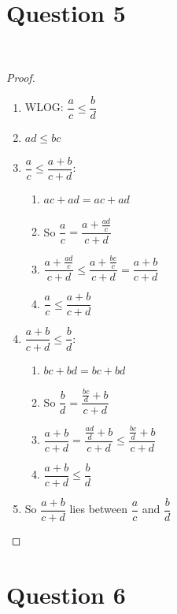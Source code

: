 \documentclass{article}
\begin{document}
\newpage

\section*{Question 5}

~

\begin{proof}
    ~
    \begin{enumerate}
        \item WLOG: $\dfrac{a}{c}\leq\dfrac{b}{d}$
        \item $ad\leq bc$
        \item $\dfrac{a}{c}\leq \dfrac{a+b}{c+d}:$
        \begin{enumerate}
            \item $ac+ad=ac+ad$
            \item So $\dfrac{a}{c}=\dfrac{a+\frac{ad}{c}}{c+d}$
            \item $\dfrac{a+\frac{ad}{c}}{c+d}\leq \dfrac{a+\frac{bc}{c}}{c+d}=\dfrac{a+b}{c+d}$
            \item $\dfrac{a}{c}\leq \dfrac{a+b}{c+d}$
        \end{enumerate}
        \item $\dfrac{a+b}{c+d}\leq \dfrac{b}{d}:$
        \begin{enumerate}
            \item $bc+bd=bc+bd$
            \item So $\dfrac{b}{d}=\dfrac{\frac{bc}{d}+b}{c+d}$
            \item $\dfrac{a+b}{c+d}=\dfrac{\frac{ad}{d}+b}{c+d}\leq\dfrac{\frac{bc}{d}+b}{c+d}$
            \item $\dfrac{a+b}{c+d}\leq\dfrac{b}{d}$
        \end{enumerate}
        \item So $\dfrac{a+b}{c+d}$ lies between $\dfrac{a}{c}$ and $\dfrac{b}{d}$
    \end{enumerate}
\end{proof}

\newpage

\section*{Question 6}

~
\end{document}
